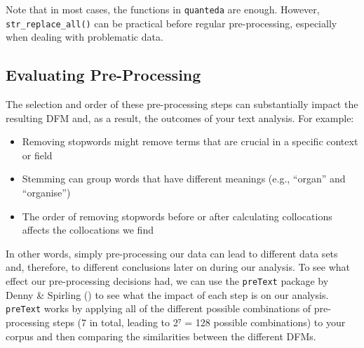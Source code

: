 \documentclass[
]{book}
\newenvironment{Shaded}{\begin{snugshade}}{\end{snugshade}}
\newcommand{\CommentTok}[1]{\textcolor[rgb]{0.56,0.35,0.01}{\textit{#1}}}
\newcommand{\FunctionTok}[1]{\textcolor[rgb]{0.13,0.29,0.53}{\textbf{#1}}}
\newcommand{\NormalTok}[1]{#1}
\newcommand{\OtherTok}[1]{\textcolor[rgb]{0.56,0.35,0.01}{#1}}
\newcommand{\SpecialCharTok}[1]{\textcolor[rgb]{0.81,0.36,0.00}{\textbf{#1}}}
\newcommand{\StringTok}[1]{\textcolor[rgb]{0.31,0.60,0.02}{#1}}
\providecommand{\tightlist}{%
  \setlength{\itemsep}{0pt}\setlength{\parskip}{0pt}}
\begin{document}
\begin{Shaded}
\end{Shaded}

Note that in most cases, the functions in \texttt{quanteda} are enough. However, \texttt{str\_replace\_all()} can be practical before regular pre-processing, especially when dealing with problematic data.

\subsection{Evaluating Pre-Processing}\label{evaluating-pre-processing}

The selection and order of these pre-processing steps can substantially impact the resulting DFM and, as a result, the outcomes of your text analysis. For example:

\begin{itemize}
\tightlist
\item
  Removing stopwords might remove terms that are crucial in a specific context or field
\item
  Stemming can group words that have different meanings (e.g., ``organ'' and ``organise'')
\item
  The order of removing stopwords before or after calculating collocations affects the collocations we find
\end{itemize}

In other words, simply pre-processing our data can lead to different data sets and, therefore, to different conclusions later on during our analysis. To see what effect our pre-processing decisions had, we can use the \texttt{preText} package by Denny \& Spirling () to see what the impact of each step is on our analysis. \texttt{preText} works by applying all of the different possible combinations of pre-processing steps (7 in total, leading to 2⁷ = 128 possible combinations) to your corpus and then comparing the similarities between the different DFMs.
\end{document}
